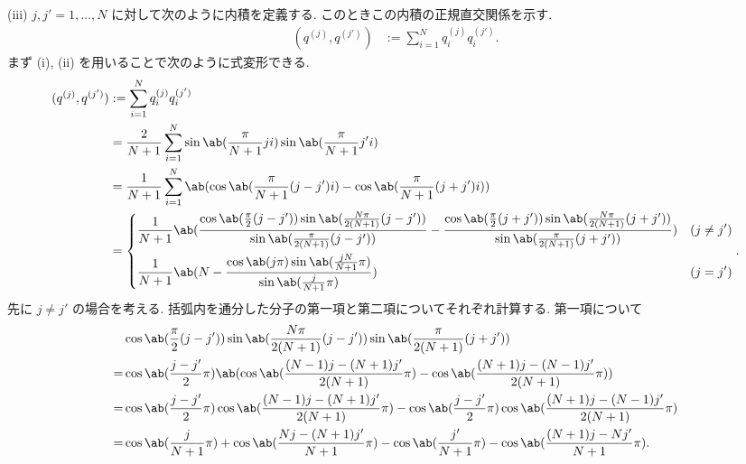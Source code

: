 \documentclass[uplatex,diffipdfmx,a4paper,11pt]{jlreq}
\theoremstyle{definition}
\begin{document}
(iii) $j, j' = 1,\ldots,N$ に対して次のように内積を定義する. このときこの内積の正規直交関係を示す.
\begin{align}
  (q^{(j)}, q^{(j')}) & := \sum_{i = 1}^{N}q_i^{(j)}q_i^{(j')}.
\end{align}
まず (i), (ii) を用いることで次のように式変形できる.
\begin{align}
  (q^{(j)}, q^{(j')}) & := \sum_{i = 1}^{N}q_i^{(j)}q_i^{(j')}                                                                                                                                                                                                                                             \\
                      & = \frac{2}{N+1}\sum_{i = 1}^{N}\sin\ab(\frac{\pi}{N+1}ji)\sin\ab(\frac{\pi}{N+1}j'i)                                                                                                                                                                                               \\
                      & = \frac{1}{N+1}\sum_{i = 1}^{N}\ab(\cos\ab(\frac{\pi}{N+1}(j - j')i) - \cos\ab(\frac{\pi}{N+1}(j + j')i))                                                                                                                                                                          \\
                      & = \begin{dcases}
                            \frac{1}{N+1}\ab(\frac{\cos\ab(\frac{\pi}{2}(j - j'))\sin\ab(\frac{N\pi}{2(N+1)}(j - j'))}{\sin\ab(\frac{\pi}{2(N+1)}(j - j'))} - \frac{\cos\ab(\frac{\pi}{2}(j + j'))\sin\ab(\frac{N\pi}{2(N+1)}(j + j'))}{\sin\ab(\frac{\pi}{2(N+1)}(j + j'))}) & (j \neq j') \\
                            \frac{1}{N+1}\ab(N - \frac{\cos\ab(j\pi)\sin\ab(\frac{jN}{N+1}\pi)}{\sin\ab(\frac{j}{N+1}\pi)})                                                                                                                                                   & (j = j')
                          \end{dcases}.
\end{align}
先に $j \neq j'$ の場合を考える. 括弧内を通分した分子の第一項と第二項についてそれぞれ計算する. 第一項について
\begin{align}
    & \cos\ab(\frac{\pi}{2}(j - j'))\sin\ab(\frac{N\pi}{2(N+1)}(j - j'))\sin\ab(\frac{\pi}{2(N+1)}(j + j'))                                                      \\
  = & \cos\ab(\frac{j - j'}{2}\pi)\ab(\cos\ab(\frac{(N-1)j - (N+1)j'}{2(N+1)}\pi) - \cos\ab(\frac{(N+1)j - (N-1)j'}{2(N+1)}\pi))                                 \\
  = & \cos\ab(\frac{j - j'}{2}\pi)\cos\ab(\frac{(N-1)j - (N+1)j'}{2(N+1)}\pi) - \cos\ab(\frac{j - j'}{2}\pi)\cos\ab(\frac{(N+1)j - (N-1)j'}{2(N+1)}\pi)          \\
  = & \cos\ab(\frac{j}{N+1}\pi) + \cos\ab(\frac{Nj - (N+1)j'}{N+1}\pi) - \cos\ab(\frac{j'}{N+1}\pi) - \cos\ab(\frac{(N+1)j - Nj'}{N+1}\pi). \label{Q17-3. iii 1}
\end{align}
\end{document}
